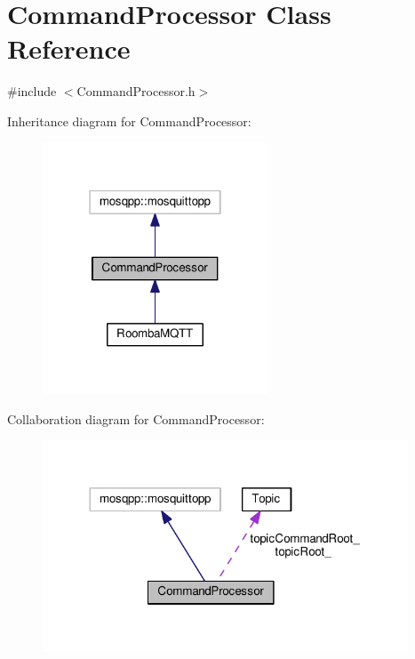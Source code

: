 \hypertarget{class_command_processor}{}\section{Command\+Processor Class Reference}
\label{class_command_processor}


{\ttfamily \#include $<$Command\+Processor.\+h$>$}



Inheritance diagram for Command\+Processor\+:\nopagebreak
\begin{figure}[H]
\begin{center}
\leavevmode
\includegraphics[width=190pt]{class_command_processor__inherit__graph}
\end{center}
\end{figure}


Collaboration diagram for Command\+Processor\+:\nopagebreak
\begin{figure}[H]
\begin{center}
\leavevmode
\includegraphics[width=308pt]{class_command_processor__coll__graph}
\end{center}
\end{figure}
